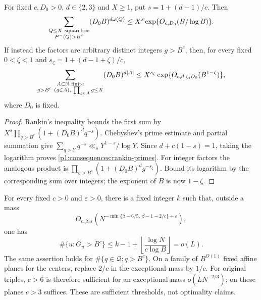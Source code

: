 \begin{lemma}
\label{p1:consequences:rankin-patterns}
For fixed $c,D_0>0$, $d\in\{2,3\}$ and $X\ge1$, put
$s=1+(d-1)/c$. Then
\begin{equation}
 \sum_{\substack{Q\le X\ {\rm squarefree}\\P^-(Q)>B^c}}
       (D_0B)^{d\omega(Q)}
 \le X^s\exp\{O_{c,D_0}(B/\log B)\}.
 \label{p1:consequences:rankin-primes}
\end{equation}
If instead the factors are arbitrary distinct integers
$g>B^c$, then, for every fixed $0<\zeta<1$ and
$s_\zeta=1+(d-1+\zeta)/c$,
\begin{equation}
 \sum_{\substack{A\subset\mathbb N\ {\rm finite}\\
                g>B^c\ (g\in A),\ \prod_{g\in A}g\le X}}
       (D_0B)^{d|A|}
 \le X^{s_\zeta}\exp\{O_{c,d,\zeta,D_0}(B^{1-\zeta})\},
 \label{p1:consequences:rankin-groups}
\end{equation}
where $D_0$ is fixed.
\end{lemma}

\begin{proof}
Rankin's inequality bounds the first sum by
$X^s\prod_{q>B^c}(1+(D_0B)^dq^{-s})$.
Chebyshev's prime estimate and partial summation give
$\sum_{q>Y}q^{-s}\ll_s Y^{1-s}/\log Y$.
Since $d+c(1-s)=1$, taking the logarithm proves
\eqref{p1:consequences:rankin-primes}. For integer factors
the analogous product is
$\prod_{g>B^c}(1+(D_0B)^dg^{-s_\zeta})$.
Bound its logarithm by the corresponding sum over integers;
the exponent of $B$ is now $1-\zeta$.
\end{proof}

\begin{proposition}
\label{p1:consequences:confinement}
For every fixed $c>0$ and $\varepsilon>0$, there is a fixed
integer $k$ such that, outside a mass
\begin{equation}
 O_{c,\beta,\varepsilon}
 \left(N^{-\min\{\beta-6/5,\,\beta-1-2/c\}+\varepsilon}\right),
 \label{p1:consequences:confinement-error}
\end{equation}
one has
\begin{equation}
 \#\{u:G_u>B^c\}
       \le k-1+\left\lfloor\frac{\log N}{c\log B}\right\rfloor=o(L).
 \label{p1:consequences:confinement-count}
\end{equation}
The same assertion holds for $\#\{q\in\mathcal Q:q>B^c\}$.
On a family of $B^{O(1)}$ fixed affine planes for the centers,
replace $2/c$ in the exceptional mass by $1/c$.
For original triples, $c>6$ is therefore sufficient for an
exceptional mass $o(LN^{-2/3})$; on these planes $c>3$
suffices. These are sufficient thresholds, not optimality claims.
\end{proposition}

